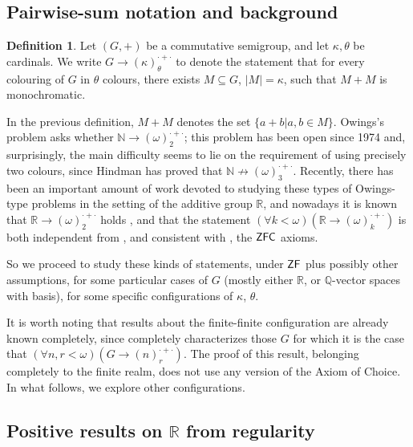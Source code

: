 \documentclass{amsart}
\theoremstyle{definition}
\newtheorem{definition}[theorem]{Definition}
\newcommand{\zf}{\mathnormal{\mathsf{ZF}}}
\newcommand{\zfc}{\mathnormal{\mathsf{ZFC}}}
\theoremstyle{remark}
\numberwithin{equation}{section}
\begin{document}
\subsection{Pairwise-sum notation and background}\label{subsec:owings-background}

\begin{definition}\label{def:owings-property}
Let $(G,+)$ be a commutative semigroup, and let $\kappa,\theta$ be cardinals. 
We write $G\to(\kappa)^{\cdot+\cdot}_{\theta}$ to denote the statement that for every colouring of $G$ in $\theta$ colours, there exists $M\subseteq G$, $|M|=\kappa$, such that $M+M$ is monochromatic.
\end{definition}

In the previous definition, $M+M$ denotes the set $\{a+b\big|a,b\in M\}$. Owings's problem \cite{Owings1974} asks whether $\mathbb N\to(\omega)^{\cdot+\cdot}_{2}$; this problem has been open since 1974 and, surprisingly, the main difficulty seems to lie on the requirement of using precisely two colours, since Hindman \cite{Hindman1979} has proved that $\mathbb N\nrightarrow(\omega)^{\cdot+\cdot}_{3}$. Recently, there has been an important amount of work devoted to studying these types of Owings-type problems in the setting of the additive group $\mathbb R$, and nowadays it is known that $\mathbb R\to(\omega)^{\cdot+\cdot}_{2}$ holds \cite{Zhang2020}, and that the statement $(\forall k<\omega)(\mathbb R\to (\omega)^{\cdot+\cdot}_{k})$ is both independent from \cite{HindmanLeaderStrauss2017}, and consistent with \cite{KomjathLeaderRussellShelahSoukupVidnyanszky2019,Zhang2020}, the $\zfc$ axioms.

So we proceed to study these kinds of statements, under $\zf$ plus possibly other assumptions, for some particular cases of $G$ (mostly either $\mathbb R$, or $\mathbb Q$-vector spaces with basis), for some specific configurations of $\kappa$, $\theta$.

It is worth noting that results about the finite-finite configuration are already known completely, since \cite[Theorem 1]{FernandezSarmientoVera2024} completely characterizes those $G$ for which it is the case that 
$(\forall n,r<\omega)(G\to (n)^{\cdot+\cdot}_{r})$. The proof of this result, belonging completely to the finite realm, does not use any version of the Axiom of Choice. In what follows, we explore other configurations.

\subsection{Positive results on $\mathbb{R}$ from regularity}\label{subsec:owings-reals}
\end{document}
